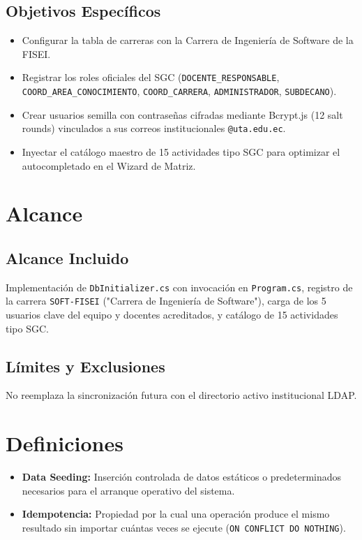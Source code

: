 \documentclass[12pt,a4paper]{article}
\begin{document}
\subsection{Objetivos Específicos}
\begin{itemize}[leftmargin=1.5em, itemsep=1.5pt, topsep=1.5pt]
    \item Configurar la tabla de carreras con la Carrera de Ingeniería de Software de la FISEI.
    \item Registrar los roles oficiales del SGC (\texttt{DOCENTE\_RESPONSABLE}, \texttt{COORD\_AREA\_CONOCIMIENTO}, \texttt{COORD\_CARRERA}, \texttt{ADMINISTRADOR}, \texttt{SUBDECANO}).
    \item Crear usuarios semilla con contraseñas cifradas mediante Bcrypt.js (12 salt rounds) vinculados a sus correos institucionales \texttt{@uta.edu.ec}.
    \item Inyectar el catálogo maestro de 15 actividades tipo SGC para optimizar el autocompletado en el Wizard de Matriz.
\end{itemize}

\section{Alcance}

\subsection{Alcance Incluido}
Implementación de \texttt{DbInitializer.cs} con invocación en \texttt{Program.cs}, registro de la carrera \texttt{SOFT-FISEI} ("Carrera de Ingeniería de Software"), carga de los 5 usuarios clave del equipo y docentes acreditados, y catálogo de 15 actividades tipo SGC.

\subsection{Límites y Exclusiones}
No reemplaza la sincronización futura con el directorio activo institucional LDAP.

\section{Definiciones}
\begin{itemize}[leftmargin=1.5em, itemsep=2pt, topsep=2pt]
    \item \textbf{Data Seeding:} Inserción controlada de datos estáticos o predeterminados necesarios para el arranque operativo del sistema.
    \item \textbf{Idempotencia:} Propiedad por la cual una operación produce el mismo resultado sin importar cuántas veces se ejecute (\texttt{ON CONFLICT DO NOTHING}).
\end{itemize}
\end{document}
